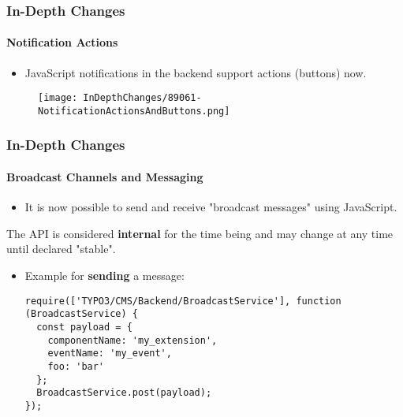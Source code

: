 
\begin{frame}[fragile]
	\frametitle{In-Depth Changes}
	\framesubtitle{Notification Actions}

	\begin{itemize}
		\item JavaScript notifications in the backend support actions (buttons) now.
	\end{itemize}

	\begin{figure}
		\texttt{[image: InDepthChanges/89061-NotificationActionsAndButtons.png]}
	\end{figure}

\end{frame}


\begin{frame}[fragile]
	\frametitle{In-Depth Changes}
	\framesubtitle{Broadcast Channels and Messaging}

	\lstset{basicstyle=\tiny\ttfamily}

	\begin{itemize}
		\item It is now possible to send and receive "broadcast messages" using JavaScript.
	\end{itemize}

	\vspace{-0.2cm}
	\begingroup
		\color{red}
			\begin{center}
				The API is considered \textbf{internal} for the time being\newline
				and may change at any time until declared "stable".
			\end{center}
	\endgroup

	\begin{itemize}
		\item Example for \textbf{sending} a message:
\begin{lstlisting}
require(['TYPO3/CMS/Backend/BroadcastService'], function (BroadcastService) {
  const payload = {
    componentName: 'my_extension',
    eventName: 'my_event',
    foo: 'bar'
  };
  BroadcastService.post(payload);
});
\end{lstlisting}

	\end{itemize}

\end{frame}

